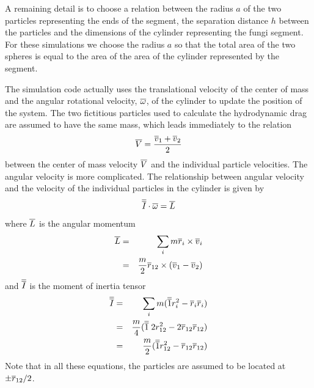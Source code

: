 \documentclass[12pt]{article}
\begin{document}
A remaining detail
is to choose a relation between the radius $a$ of the two particles representing
the ends of the segment, the separation distance $h$ between the particles and
the dimensions of the cylinder representing the fungi segment. For these simulations
we choose the radius $a$ so that the total area of the two spheres is equal to the
area of the area of the cylinder represented by the segment.

The simulation code actually uses the translational velocity of the center of mass and
the angular rotational velocity, $\overline{\omega}$, of the cylinder to update the position of the system.
The two fictitious particles used to  calculate the hydrodynamic drag are assumed to
have the same mass, which leads immediately to the relation
\[
\overline{V} = \frac{\overline{v}_1+\overline{v}_2}{2}
\]
between the center of mass velocity $\overline{V}$ and the individual particle velocities.
The angular velocity is more complicated. The relationship between angular velocity
and the velocity of the individual particles in the cylinder is given by
\[
\overline{\overline{I}}\cdot\overline{\omega} = \overline{L}
\]
where $\overline{L}$ is the angular momentum
\begin{eqnarray*}
\overline{L} & = & \sum_i m\overline{r}_i\times\overline{v}_i\\
& = & \frac{m}{2}\overline{r}_{12}\times(\overline{v}_1-\overline{v}_2)
\end{eqnarray*}
and $\overline{\overline{I}}$ is the moment of inertia tensor
\begin{eqnarray*}
\overline{\overline{I}} & = & \sum_i m (\overline{\overline{1}} r_i^2-\overline{r}_i\overline{r}_i) \\
& = & \frac{m}{4}(\overline{\overline{1}}\; 2r_{12}^2-2\overline{r}_{12}\overline{r}_{12}) \\
& = & \frac{m}{2}(\overline{\overline{1}} r_{12}^2-\overline{r}_{12}\overline{r}_{12}) \\
\end{eqnarray*}
Note that in all these equations, the particles are assumed to be located at
$\pm \overline{r}_{12}/2$.
\end{document}
